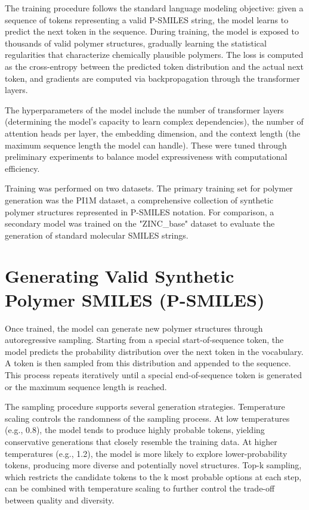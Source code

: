 The training procedure follows the standard language modeling objective: given a sequence of tokens representing a valid P-SMILES string, the model learns to predict the next token in the sequence. During training, the model is exposed to thousands of valid polymer structures, gradually learning the statistical regularities that characterize chemically plausible polymers. The loss is computed as the cross-entropy between the predicted token distribution and the actual next token, and gradients are computed via backpropagation through the transformer layers.

The hyperparameters of the model include the number of transformer layers (determining the model's capacity to learn complex dependencies), the number of attention heads per layer, the embedding dimension, and the context length (the maximum sequence length the model can handle). These were tuned through preliminary experiments to balance model expressiveness with computational efficiency.

Training was performed on two datasets. The primary training set for polymer generation was the PI1M dataset, a comprehensive collection of synthetic polymer structures represented in P-SMILES notation. For comparison, a secondary model was trained on the "ZINC\_base" dataset to evaluate the generation of standard molecular SMILES strings.

\section{Generating Valid Synthetic Polymer SMILES (P-SMILES)}
\label{sec:generating_psmiles}

Once trained, the model can generate new polymer structures through autoregressive sampling. Starting from a special start-of-sequence token, the model predicts the probability distribution over the next token in the vocabulary. A token is then sampled from this distribution and appended to the sequence. This process repeats iteratively until a special end-of-sequence token is generated or the maximum sequence length is reached.

The sampling procedure supports several generation strategies. Temperature scaling controls the randomness of the sampling process. At low temperatures (e.g., 0.8), the model tends to produce highly probable tokens, yielding conservative generations that closely resemble the training data. At higher temperatures (e.g., 1.2), the model is more likely to explore lower-probability tokens, producing more diverse and potentially novel structures. Top-k sampling, which restricts the candidate tokens to the k most probable options at each step, can be combined with temperature scaling to further control the trade-off between quality and diversity.

